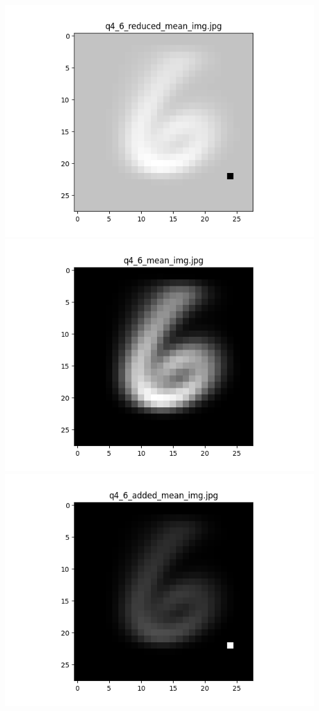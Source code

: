 \documentclass{article}
\begin{document}
    \\
    \includegraphics[scale=.37]{../results/q4/reduced_mean_images/q4_6_reduced_mean_img.png}
    \includegraphics[scale=.37]{../results/q4/mean_images/q4_6_mean_img.png}
    \includegraphics[scale=.37]{../results/q4/added_mean_images/q4_6_added_mean_img.png}
\end{document}
